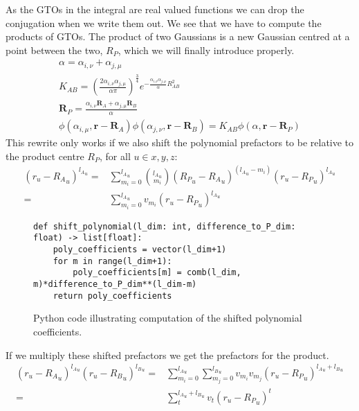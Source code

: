 As the GTOs in the integral are real valued functions we can drop the conjugation when we write them out.
We see that we have to compute the products of GTOs. The product of two Gaussians is a new Gaussian centred at a point between the two, $R_P$, which we will finally introduce properly.
\begin{gather}
    \alpha = \alpha_{i,\nu}+\alpha_{j,\mu}\\
    K_{AB} = \left(\frac{2\alpha_{i,\nu}\alpha_{j,\mu}}{\alpha\pi}\right)^\frac{3}{4}e^{-\frac{\alpha_{i,\nu}\alpha_{j,\mu}}{\alpha}R_{AB}^2}\\
    \pmb R_P = \frac{\alpha_{i,\nu}\pmb R_A+\alpha_{j,\mu}\pmb R_B}{\alpha}\\
    \phi(\alpha_{i,\mu},\pmb r-\pmb R_A)\phi(\alpha_{j,\nu},\pmb r-\pmb R_B) = K_{AB}\phi(\alpha,\pmb r-\pmb R_P)
\end{gather}
This rewrite only works if we also shift the polynomial prefactors to be relative to the product centre $R_P$, for all $u\in x,y,z$\cite[eq. 5.46]{daudel1983}:
\begin{equation}
\begin{split}
    (r_u-{R_A}_u)^{{l_A}_u} = &\sum_{m_i=0}^{{l_A}_u}\binom{{l_A}_u}{m_i}({R_P}_u-{R_A}_u)^{({l_A}_u-m_i)}(r_u-{R_P}_u)^{{l_A}_u}\\
    =&\sum_{m_i=0}^{{l_A}_u}v_{m_i}(r_u-{R_P}_u)^{{l_A}_u}
\end{split}
\end{equation}
\begin{figure}[H]
\begin{verbatim}
def shift_polynomial(l_dim: int, difference_to_P_dim: float) -> list[float]:
    poly_coefficients = vector(l_dim+1)
    for m in range(l_dim+1):
        poly_coefficients[m] = comb(l_dim, m)*difference_to_P_dim**(l_dim-m)
    return poly_coefficients
\end{verbatim}
    \caption{Python code illustrating computation of the shifted polynomial coefficients.}
\end{figure}
If we multiply these shifted prefactors we get the prefactors for the product. 
\begin{equation}
\begin{split}
    (r_u-{R_A}_u)^{{l_A}_u}(r_u-{R_B}_u)^{{l_B}_u} = &\sum_{m_i=0}^{{l_A}_u}\sum_{m_j=0}^{{l_B}_u}v_{m_i}v_{m_j}(r_u-{R_P}_u)^{{l_A}_u+{l_B}_u}\\
    =&\sum_t^{{l_A}_u+{l_B}_u}v_t(r_u-{R_P}_u)^t
\end{split}
\end{equation}

